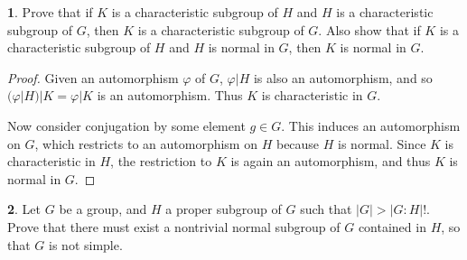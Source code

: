 \documentclass[12pt]{article}
\theoremstyle{definition}
\newtheorem{ex}{}
\begin{document}
\begin{ex}
	Prove that if $K$ is a characteristic subgroup of $H$ and $H$ is a characteristic subgroup of $G$, then $K$ is a characteristic subgroup of $G$.
	Also show that if $K$ is a characteristic subgroup of $H$ and $H$ is normal in $G$, then $K$ is normal in $G$.
\end{ex}
\begin{proof}
  Given an automorphism $\varphi$ of $G$, $\varphi|H$ is also an automorphism, and so $(\varphi|H)|K = \varphi|K$ is an automorphism.
  Thus $K$ is characteristic in $G$.

  Now consider conjugation by some element $g \in G$.
  This induces an automorphism on $G$, which restricts to an automorphism on $H$ because $H$ is normal.
  Since $K$ is characteristic in $H$, the restriction to $K$ is again an automorphism, and thus $K$ is normal in $G$.
\end{proof}

\begin{ex}
	Let $G$ be a group, and $H$ a proper subgroup of $G$ such that $|G| > |G : H|!$.
	Prove that there must exist a nontrivial normal subgroup of $G$ contained in $H$, so that $G$ is not simple.
\end{ex}
\end{document}
